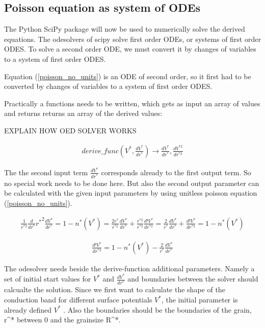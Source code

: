 \documentclass[11pt]{article}
\begin{document}
\hypertarget{poisson-equation-as-system-of-odes}{%
\subsection{Poisson equation as system of
ODEs}\label{poisson-equation-as-system-of-odes}}

The Python SciPy package \cite{Jones} will now be used to numerically
solve the derived equations. The odesolvers of scipy solve first order
ODEs, or systems of first order ODES. To solve a second order ODE, we
must convert it by changes of variables to a system of first order ODES.

Equation (\ref{poisson_no_units}) is an ODE of second order, so it first
had to be converted by changes of variables to a system of first order
ODES.

Practically a functions needs to be written, which gets as input an
array of values and returns returns an array of the derived values:

EXPLAIN HOW OED SOLVER WORKS

\begin{align}
derive\_func\left(V^{*},\frac{dV^{*}}{dr^{*}}\right)\longrightarrow\frac{dV^{*}}{dr^{*}},\frac{dV^{*2}}{dr^{*2}}
\end{align}

The the second input term \(\frac{dV^{*}}{dr^{*}}\) corresponds already
to the first output term. So no special work needs to be done here. But
also the second output parameter can be calculated with the given input
parameters by using unitless poisson equation (\ref{poisson_no_units}).

\begin{align}
\frac{1}{r^{*2}}\frac{d}{dr^{*}}{r^{*}}^{2}\frac{dV^{*}}{dr^{*}}=1-n^{*}(V^{*})=\frac{2r^{*}}{r^{*2}}\frac{dV^{*}}{dr^{*}}+\frac{r^{*2}}{r^{*2}}\frac{d²V^{*}}{dr^{*2}}=\frac{2}{r^{*}}\frac{dV^{*}}{dr^{*}}+\frac{d²V^{*}}{dr^{*2}}=1-n^{*}(V^{*}) 
\end{align}

\begin{align}
\frac{d²V^{*}}{dr^{*2}}=1-n^{*}(V^{*})-\frac{2}{r^{*}}\frac{dV^{*}}{dr^{*}}\label{second_derivative}\tag{Second derivative}
\end{align}

The odesolver needs beside the derive-function additional parameters.
Namely a set of initial start values for \(V^{*}\) and
\(\frac{dV^{*}}{dr^{*}}\) and boundaries between the solver should
calcualte the solution. Since we first want to calculate the shape of
the conduction band for different surface potentials \(V^{*}\), the
initial parameter is already defined \(V^{*}\) . Also the boundaries
should be the boundaries of the grain, r\^{}* between 0 and the
grainsize R\^{}*.
\end{document}
